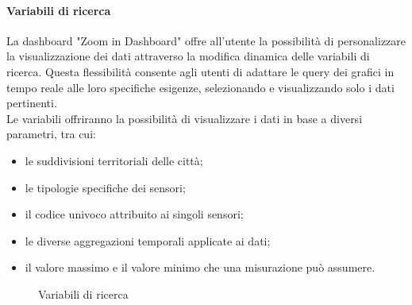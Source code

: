 \paragraph{Variabili di ricerca}
\hypertarget{par:variabili_panel}{}

La dashboard "Zoom in Dashboard" offre all'utente la possibilità di personalizzare la visualizzazione dei dati attraverso la modifica dinamica delle variabili di ricerca. Questa flessibilità consente agli utenti di adattare le query dei grafici in tempo reale alle loro specifiche esigenze, selezionando e visualizzando solo i dati pertinenti. \\
Le variabili offriranno la possibilità di visualizzare i dati in base a diversi parametri, tra cui:
\begin{itemize}
    \item le suddivisioni territoriali delle città;
    \item le tipologie specifiche dei sensori;
    \item il codice univoco attribuito ai singoli sensori;
    \item le diverse aggregazioni temporali applicate ai dati;
    \item il valore massimo e il valore minimo che una misurazione può assumere.
\end{itemize}
\begin{figure}[H]
    \centering
    \caption{Variabili di ricerca}
    \label{fig:my_label}
\end{figure}



